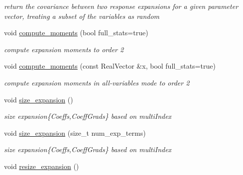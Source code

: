 \begin{DoxyCompactItemize}
\begin{DoxyCompactList}\small\item\em return the covariance between two response expansions for a given parameter vector, treating a subset of the variables as random \end{DoxyCompactList}\item 
void \hyperlink{classPecos_1_1OrthogPolyApproximation_a5926c67431b0fc223fcfa6c11cb9de14}{compute\+\_\+moments} (bool full\+\_\+stats=true)\label{classPecos_1_1OrthogPolyApproximation_a5926c67431b0fc223fcfa6c11cb9de14}

\begin{DoxyCompactList}\small\item\em compute expansion moments to order 2 \end{DoxyCompactList}\item 
void \hyperlink{classPecos_1_1OrthogPolyApproximation_a2a6098ab4416bdcfdeadea5d46aa5f52}{compute\+\_\+moments} (const Real\+Vector \&x, bool full\+\_\+stats=true)\label{classPecos_1_1OrthogPolyApproximation_a2a6098ab4416bdcfdeadea5d46aa5f52}

\begin{DoxyCompactList}\small\item\em compute expansion moments in all-\/variables mode to order 2 \end{DoxyCompactList}\item 
void \hyperlink{classPecos_1_1OrthogPolyApproximation_a425685016976e6863c98b837883fa038}{size\+\_\+expansion} ()\label{classPecos_1_1OrthogPolyApproximation_a425685016976e6863c98b837883fa038}

\begin{DoxyCompactList}\small\item\em size expansion\{Coeffs,Coeff\+Grads\} based on multi\+Index \end{DoxyCompactList}\item 
void \hyperlink{classPecos_1_1OrthogPolyApproximation_a276dc60aec886932d86fd04e9698b63e}{size\+\_\+expansion} (size\+\_\+t num\+\_\+exp\+\_\+terms)\label{classPecos_1_1OrthogPolyApproximation_a276dc60aec886932d86fd04e9698b63e}

\begin{DoxyCompactList}\small\item\em size expansion\{Coeffs,Coeff\+Grads\} based on multi\+Index \end{DoxyCompactList}\item 
void \hyperlink{classPecos_1_1OrthogPolyApproximation_a9f739bb549630d4cc9ab914a17e16bd2}{resize\+\_\+expansion} ()\label{classPecos_1_1OrthogPolyApproximation_a9f739bb549630d4cc9ab914a17e16bd2}


\end{DoxyCompactItemize}
